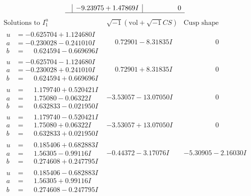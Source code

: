 \documentclass[1p]{elsarticle_modified}
\theoremstyle{definition}
\newcommand{\I}{\sqrt{-1}}
\begin{document}
$$\begin{array}{c|c|c}
 & -9.23975 + 1.47869 I & \phantom{-0.000000 } 0\\
 \hline 
 \end{array}$$\newpage$$\begin{array}{c|c|c}  
\text{Solutions to }I^u_{1}& \I (\text{vol} + \sqrt{-1}CS) & \text{Cusp shape}\\
 \hline 
\begin{aligned}
u &= -0.625704 + 1.124680 I \\
a &= -0.230028 - 0.241010 I \\
b &= \phantom{-}0.624594 - 0.669696 I\end{aligned}
 & \phantom{-}0.72901 - 8.31835 I & \phantom{-0.000000 } 0 \\ \hline\begin{aligned}
u &= -0.625704 - 1.124680 I \\
a &= -0.230028 + 0.241010 I \\
b &= \phantom{-}0.624594 + 0.669696 I\end{aligned}
 & \phantom{-}0.72901 + 8.31835 I & \phantom{-0.000000 } 0 \\ \hline\begin{aligned}
u &= \phantom{-}1.179740 + 0.520421 I \\
a &= \phantom{-}1.75080 - 0.06322 I \\
b &= \phantom{-}0.632833 - 0.021950 I\end{aligned}
 & -3.53057 - 13.07050 I & \phantom{-0.000000 } 0 \\ \hline\begin{aligned}
u &= \phantom{-}1.179740 - 0.520421 I \\
a &= \phantom{-}1.75080 + 0.06322 I \\
b &= \phantom{-}0.632833 + 0.021950 I\end{aligned}
 & -3.53057 + 13.07050 I & \phantom{-0.000000 } 0 \\ \hline\begin{aligned}
u &= \phantom{-}0.185406 + 0.682883 I \\
a &= \phantom{-}1.56305 - 0.99116 I \\
b &= \phantom{-}0.274608 + 0.247795 I\end{aligned}
 & -0.44372 - 3.17076 I & -5.30905 - 2.16030 I \\ \hline\begin{aligned}
u &= \phantom{-}0.185406 - 0.682883 I \\
a &= \phantom{-}1.56305 + 0.99116 I \\
b &= \phantom{-}0.274608 - 0.247795 I\end{aligned}

\end{array}$$
\end{document}
